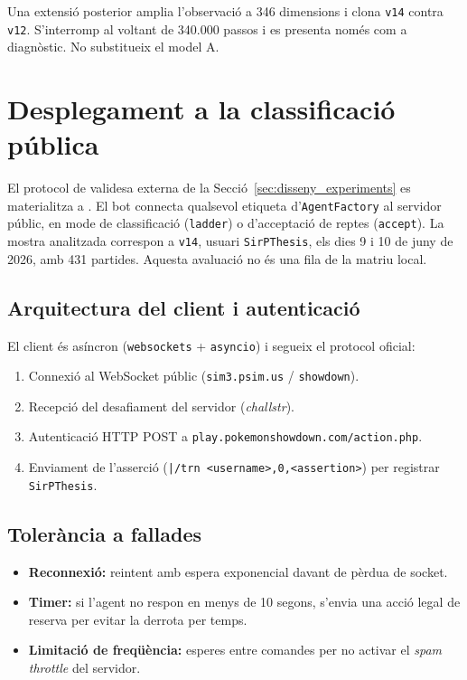 Una extensió posterior amplia l'observació a 346 dimensions i clona \texttt{v14} contra \texttt{v12}. S'interromp al voltant de 340.000 passos i es presenta només com a diagnòstic. No substitueix el model A.

\section{Desplegament a la classificació pública}
\label{sec:deployment}

El protocol de validesa externa de la Secció~\ref{sec:disseny_experiments} es materialitza a . El bot connecta qualsevol etiqueta d'\texttt{AgentFactory} al servidor públic, en mode de classificació (\texttt{ladder}) o d'acceptació de reptes (\texttt{accept}). La mostra analitzada correspon a \texttt{v14}, usuari \texttt{SirPThesis}, els dies 9 i 10 de juny de 2026, amb 431 partides. Aquesta avaluació no és una fila de la matriu local.

\subsection{Arquitectura del client i autenticació}

El client és asíncron (\texttt{websockets} + \texttt{asyncio}) i segueix el protocol oficial:

\begin{enumerate}
    \item Connexió al WebSocket públic (\texttt{sim3.psim.us} / \texttt{showdown}).
    \item Recepció del desafiament del servidor (\emph{challstr}).
    \item Autenticació HTTP POST a \texttt{play.pokemonshowdown.com/action.php}.
    \item Enviament de l'asserció (\texttt{|/trn <username>,0,<assertion>}) per registrar \texttt{SirPThesis}.
\end{enumerate}

\subsection{Tolerància a fallades}

\begin{itemize}
    \item \textbf{Reconnexió:} reintent amb espera exponencial davant de pèrdua de socket.
    \item \textbf{Timer:} si l'agent no respon en menys de 10 segons, s'envia una acció legal de reserva per evitar la derrota per temps.
    \item \textbf{Limitació de freqüència:} esperes entre comandes per no activar el \emph{spam throttle} del servidor.
\end{itemize}

